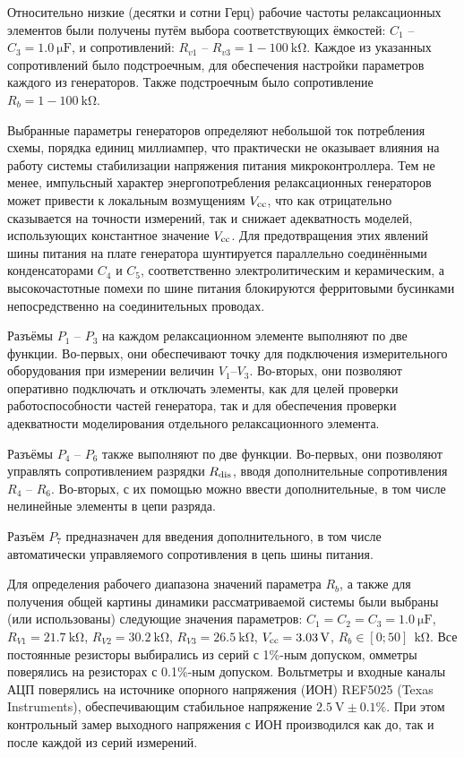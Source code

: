 Относительно низкие (десятки и сотни Герц) рабочие частоты
релаксационных элементов были получены путём выбора соответствующих
ёмкостей:
$C_1$ -- $C_3 = \SI{1.0}{\micro\farad}$,
и сопротивлений:
$R_{v1}$ -- $R_{v3} = 1-\SI{100}{\kilo\ohm}$.
Каждое из указанных сопротивлений было подстроечным, для обеспечения
настройки параметров каждого из генераторов. Также подстроечным было сопротивление
$ R_{b} = 1-\SI{100}{\kilo\ohm}$.

Выбранные параметры генераторов определяют небольшой ток
потребления схемы, порядка единиц миллиампер, что
практически не оказывает влияния на работу
системы стабилизации напряжения питания микроконтроллера.
Тем не менее, импульсный характер энергопотребления
релаксационных генераторов может привести
к локальным возмущениям $V_\mathrm{cc}$, что
как отрицательно сказывается на точности измерений,
так и снижает адекватность моделей, использующих
константное значение $V_\mathrm{cc}$.
Для предотвращения этих явлений шины питания на плате генератора
шунтируется параллельно соединёнными конденсаторами $C_4$ и $C_5$,
соответственно электролитическим и керамическим,
а высокочастотные помехи по шине питания блокируются
ферритовыми бусинками непосредственно на соединительных проводах.

Разъёмы $P_1$ -- $P_3$ на каждом  релаксационном элементе
выполняют по две функции.
Во-первых, они обеспечивают точку для подключения измерительного
оборудования при измерении величин $V_1$--$V_3$.
Во-вторых, они позволяют оперативно
подключать и отключать элементы, как для целей
проверки работоспособности частей генератора,
так и для обеспечения проверки адекватности моделирования
отдельного релаксационного элемента.


Разъёмы $P_4$ -- $P_6$
также выполняют по две функции.
Во-первых, они позволяют управлять сопротивлением
разрядки $R_\mathrm{dis}$, вводя дополнительные сопротивления
$R_4$ -- $R_6$.
Во-вторых, с их помощью можно ввести дополнительные,
в том числе нелинейные элементы в цепи разряда.

Разъём $P_7$
предназначен для введения дополнительного,
в том числе автоматически управляемого сопротивления
в цепь шины питания.

Для определения рабочего диапазона значений параметра $R_b$,
а также для получения общей картины динамики рассматриваемой системы
были выбраны (или использованы) следующие значения параметров:
$C_1 = C_2 = C_3 = \SI{1.0}{\micro\farad}$,
$R_{V1} = \SI{21.7}{\kilo\ohm}$,
$R_{V2} = \SI{30.2}{\kilo\ohm}$,
$R_{V3} = \SI{26.5}{\kilo\ohm}$,
$V_\mathrm{cc} = \SI{3.03}{\volt}$,
$R_{b} \in [0;50]~ \SI{}{\kilo\ohm}$.
Все постоянные резисторы выбирались из серий с 1\%-ным допуском,
омметры поверялись на резисторах с 0.1\%-ным допуском.
Вольтметры и входные каналы АЦП
поверялись на источнике опорного напряжения (ИОН)
REF5025 (Texas Instruments), обеспечивающим
стабильное напряжение $\SI{2.5}{\volt} \pm 0.1 \%$.
При этом контрольный замер выходного напряжения с ИОН
производился как до, так и после каждой из серий измерений.

